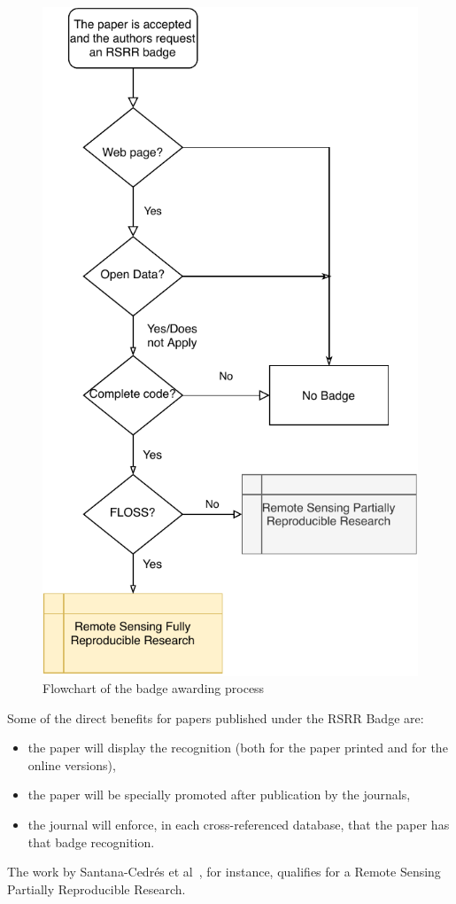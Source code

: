 \documentclass[journal,twoside]{IEEEtran}
\begin{document}
\begin{figure}[hbt]
	\centering
	\includegraphics[width=.7\columnwidth]{BadgeAwardingProcess}
	\caption{Flowchart of the badge awarding process}\label{Fig:BadgeProcess}
\end{figure}

Some of the direct benefits for papers published under the RSRR Badge are:
\begin{itemize}
	\item the paper will display the recognition (both for the paper printed and for the online versions),
	\item the paper will be specially promoted after publication by the journals,
	\item the journal will enforce, in each cross-referenced database, that the paper has that badge recognition.
\end{itemize}

The work by Santana-Cedr\'es et al~\cite{DespecklingPolSARImageswithaStructureTensorFilter2019}, for instance, qualifies for a Remote Sensing Partially Reproducible Research.
\end{document}
